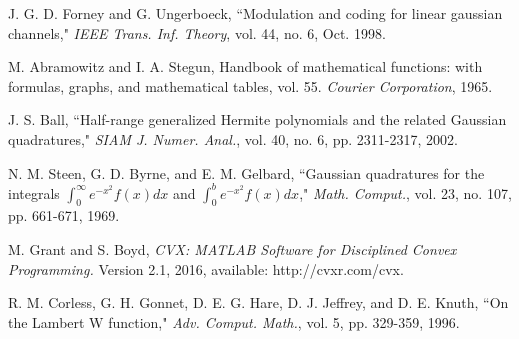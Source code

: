 \documentclass[journal]{IEEEtran}
\begin{document}
\begin{thebibliography}{1}	
J. G. D. Forney and G. Ungerboeck, ``Modulation and coding for linear gaussian channels," \emph{IEEE Trans. Inf. Theory}, vol. 44, no. 6, Oct. 1998.

M. Abramowitz and I. A. Stegun, Handbook of mathematical functions: with formulas, graphs, and mathematical tables, vol. 55. \emph{Courier Corporation}, 1965.

J. S. Ball, ``Half-range generalized Hermite polynomials and the related Gaussian quadratures," \emph{SIAM J. Numer. Anal.}, vol. 40, no. 6, pp. 2311-2317, 2002.

N. M. Steen, G. D. Byrne, and E. M. Gelbard, ``Gaussian quadratures for the integrals $\int_{0}^{\infty} e^{-x^2}f\left(x\right) dx$ and $\int_{0}^{b}e^{-x^2}f\left(x\right)dx$," \emph{ Math. Comput.}, vol. 23, no. 107, pp. 661-671, 1969.

M. Grant and S. Boyd, \emph{CVX: MATLAB Software for Disciplined Convex Programming.} Version 2.1, 2016, available: http://cvxr.com/cvx.

R. M. Corless, G. H. Gonnet, D. E. G. Hare, D. J. Jeffrey, and D. E.
Knuth, ``On the Lambert W function," \emph{Adv. Comput. Math.}, vol. 5, pp. 329-359, 1996.
\end{thebibliography}
\end{document}
